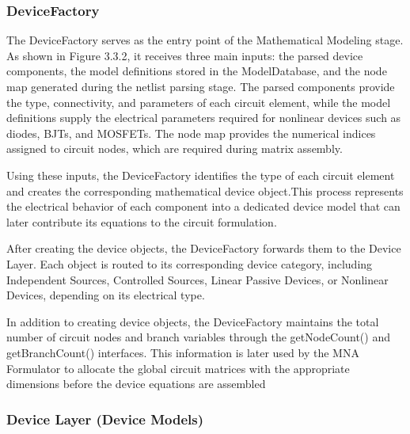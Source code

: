 \subsubsection{DeviceFactory}
The DeviceFactory serves as the entry point of the Mathematical Modeling stage. As shown in Figure 3.3.2, it receives three main inputs: the parsed device components, the model definitions stored in the ModelDatabase, and the node map generated during the netlist parsing stage. The parsed components provide the type, connectivity, and parameters of each circuit element, while the model definitions supply the electrical parameters required for nonlinear devices such as diodes, BJTs, and MOSFETs. The node map provides the numerical indices assigned to circuit nodes, which are required during matrix assembly.

Using these inputs, the DeviceFactory identifies the type of each circuit element and creates the corresponding mathematical device object.This process represents the electrical behavior of each component into a dedicated device model that can later contribute its equations to the circuit formulation.

After creating the device objects, the DeviceFactory forwards them to the Device Layer. Each object is routed to its corresponding device category, including Independent Sources, Controlled Sources, Linear Passive Devices, or Nonlinear Devices, depending on its electrical type. 

In addition to creating device objects, the DeviceFactory maintains the total number of circuit nodes and branch variables through the getNodeCount() and getBranchCount() interfaces. This information is later used by the MNA Formulator to allocate the global circuit matrices with the appropriate dimensions before the device equations are assembled
\subsubsection{Device Layer (Device Models)}

